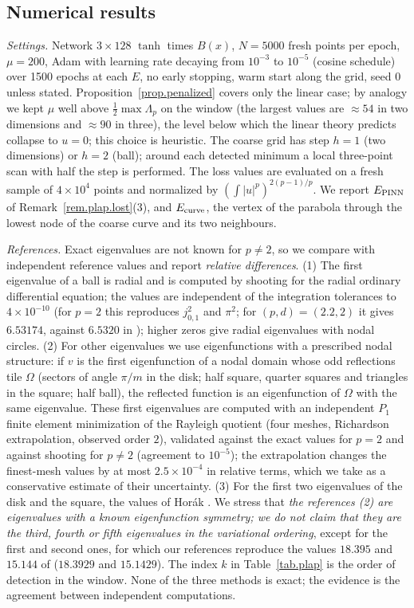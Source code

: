 \documentclass[10pt]{amsart}
\newenvironment{revblock}{\color{blue}}{}
\theoremstyle{definition}
\theoremstyle{remark}
\theoremstyle{plain}
\begin{document}
\begin{revblock}
\subsection{Numerical results}
\emph{Settings.} Network $3\times128$ $\tanh$ times $B(x)$, $N=5000$ fresh points per epoch, $\mu=200$,
Adam with learning rate decaying from $10^{-3}$ to $10^{-5}$ (cosine schedule) over 1500 epochs at
each $E$, no early stopping, warm start along the grid, seed 0 unless stated. Proposition~\ref{prop.penalized}
covers only the linear case; by analogy we kept $\mu$ well above $\frac12\max\Lambda_p$ on the window
(the largest values are $\approx54$ in two dimensions and $\approx90$ in three), the level below which
the linear theory predicts collapse to $u=0$; this choice is heuristic. The coarse grid has step $h=1$
(two dimensions) or $h=2$ (ball); around each detected minimum a local three-point scan with half the
step is performed. The loss values are evaluated on a fresh sample of $4\times10^4$ points and
normalized by $(\int|u|^p)^{2(p-1)/p}$. We report $E_{\rm PINN}$ of Remark~\ref{rem.plap.lost}(3), and
$E_{\rm curve}$, the vertex of the parabola through the lowest node of the coarse curve and its two
neighbours.

\emph{References.} Exact eigenvalues are not known for $p\ne2$, so we compare with independent
reference values and report \emph{relative differences}. (1) The first eigenvalue of a ball is
radial and is computed by shooting for the radial ordinary differential equation; the values are
independent of the integration tolerances to $4\times10^{-10}$ (for $p=2$ this reproduces $j_{0,1}^2$
and $\pi^2$; for $(p,d)=(2.2,2)$ it gives $6.53174$, against $6.5320$ in \cite{HJ11}); higher zeros
give radial eigenvalues with nodal circles. (2) For other eigenvalues we use eigenfunctions with a
prescribed nodal structure: if $v$ is the first eigenfunction of a nodal domain whose odd reflections
tile $\Omega$ (sectors of angle $\pi/m$ in the disk; half square, quarter squares and triangles in
the square; half ball), the reflected function is an eigenfunction of $\Omega$ with the same
eigenvalue. These first eigenvalues are computed with an independent $P_1$ finite element
minimization of the Rayleigh quotient (four meshes, Richardson extrapolation, observed order $2$),
validated against the exact values for $p=2$ and against shooting for $p\neq2$ (agreement to
$10^{-5}$); the extrapolation changes the finest-mesh values by at most $2.5\times10^{-4}$ in
relative terms, which we take as a conservative estimate of their uncertainty. (3) For the first two
eigenvalues of the disk and the square, the values of Hor\'ak \cite{HJ11}. We stress that \emph{the
references (2) are eigenvalues with a known eigenfunction symmetry; we do not claim that they are
the third, fourth or fifth eigenvalues in the variational ordering}, except for the first and second
ones, for which our references reproduce the values $18.395$ and $15.144$ of \cite{HJ11} ($18.3929$
and $15.1429$). The index $k$ in Table~\ref{tab.plap} is the order of detection in the window. None
of the three methods is exact; the evidence is the agreement between independent computations.


\end{revblock}
\end{document}
